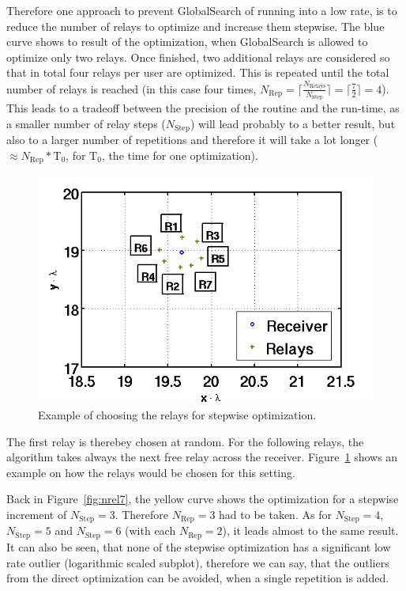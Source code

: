 Therefore one approach to prevent GlobalSearch of running into a low rate, is to reduce the number of relays to optimize and increase them stepwise.
The blue curve shows to result of the optimization, when GlobalSearch is allowed to optimize only two relays.
Once finished, two additional relays are considered so that in total four relays per user are optimized.
This is repeated until the total number of relays is reached (in this case four times, $N_{\text{Rep}} = \lceil\frac{N_{\text{Relays}}}{N_{\text{Step}}}\rceil = \lceil\frac{7}{2}\rceil=4$).
This leads to a tradeoff between the precision of the routine and the run-time, as a smaller number of relay steps ($ N_{\text{Step}}$) will lead probably to a better result, but also to a larger number of repetitions and therefore it will take a lot longer ($\approx N_{\text{Rep}}*\text{T}_0$, for $\text{T}_0$, the time for one optimization).

\begin{figure}[h]
\centering
  \includegraphics[width=0.6\linewidth]{images/choice_of_relays.png}
\caption{Example of choosing the relays for stepwise optimization.}
\label{fig:rel_choice}
\end{figure}

The first relay is therebey chosen at random.
For the following relays, the algorithm takes always the next free relay across the receiver.
Figure~\ref{fig:rel_choice} shows an example on how the relays would be chosen for this setting.

Back in Figure~\ref{fig:nrel7}, the yellow curve shows the optimization for a stepwise increment of $N_{\text{Step}}=3$.
Therefore $N_{\text{Rep}} = 3$ had to be taken.
As for $N_{\text{Step}}=4$, $N_{\text{Step}}=5$ and $N_{\text{Step}}=6$ (with each $N_{\text{Rep}} = 2$), it leads almost to the same result.
It can also be seen, that none of the stepwise optimization has a significant low rate outlier (logarithmic scaled subplot), therefore we can say, that the outliers from the direct optimization can be avoided, when a single repetition is added.

